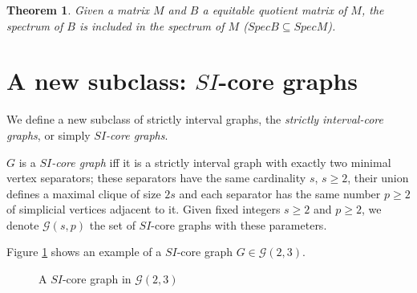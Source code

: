 \documentclass[preprint,12pt]{elsarticle}
\newtheorem{theorem}{Theorem}
\begin{document}
\begin{theorem}\label{theo:equitable}{\rm\cite{YYSX19}}
Given a matrix $M$ and $B$ a equitable quotient matrix of $M$, the spectrum of $B$ is included in the spectrum of $M$ ($SpecB \subseteq SpecM$).
\end{theorem} 








\section{A new subclass: $SI$-core graphs}

We  define a new subclass of strictly interval graphs, the {\it strictly interval-core graphs},
or simply {\it $SI$-core graphs}.

$G$ is a {\it $SI$-core graph} iff it is a strictly interval graph with  exactly two minimal vertex separators;
 these separators have the same cardinality $s$, $s \geq 2$, their union defines a maximal clique of size $2s$
 and each separator has the same number $p \geq 2$ of simplicial vertices adjacent to it.
Given fixed integers $s\geq 2$ and $p \geq 2$, we denote $\mathcal{G}(s,p)$ the set of $SI$-core graphs
with these parameters.


Figure \ref{fig:plain} shows an example of a $SI$-core graph $G \in \mathcal{G}(2,3)$.  

\begin{figure}[h]
\begin{center}
\caption{A $SI$-core graph in $\mathcal{G}(2,3)$}
\label{fig:plain}
\end{center}
\end{figure}
\end{document}

